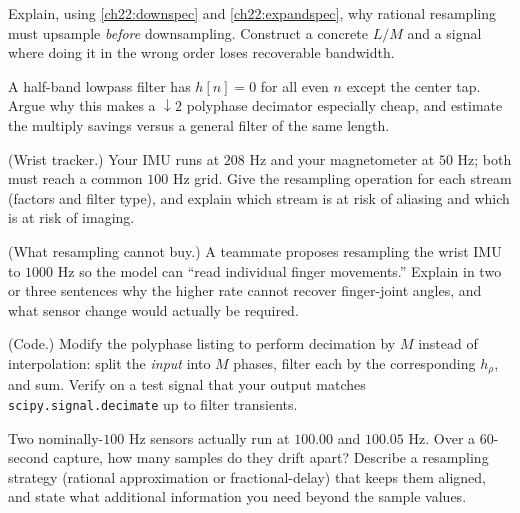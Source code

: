 \begin{exercise}
Explain, using \eqref{ch22:downspec} and \eqref{ch22:expandspec}, why rational
resampling must upsample \emph{before} downsampling. Construct a concrete $L/M$
and a signal where doing it in the wrong order loses recoverable bandwidth.
\end{exercise}

\begin{exercise}
A half-band lowpass filter has $h[n]=0$ for all even $n$ except the center tap.
Argue why this makes a $\downarrow 2$ polyphase decimator especially cheap, and
estimate the multiply savings versus a general filter of the same length.
\end{exercise}

\begin{exercise}
(Wrist tracker.) Your IMU runs at $208$ Hz and your magnetometer at $50$ Hz; both
must reach a common $100$ Hz grid. Give the resampling operation for each stream
(factors and filter type), and explain which stream is at risk of aliasing and
which is at risk of imaging.
\end{exercise}

\begin{exercise}
(What resampling cannot buy.) A teammate proposes resampling the wrist IMU to
$1000$ Hz so the model
can ``read individual finger movements.'' Explain in two or three sentences why
the higher rate cannot recover finger-joint angles, and what sensor change would
actually be required.
\end{exercise}

\begin{exercise}
(Code.) Modify the polyphase listing to perform decimation by $M$ instead of
interpolation: split the \emph{input} into $M$ phases, filter each by the
corresponding $h_\rho$, and sum. Verify on a test signal that your output matches
\texttt{scipy.signal.decimate} up to filter transients.
\end{exercise}

\begin{exercise}
Two nominally-$100$ Hz sensors actually run at $100.00$ and $100.05$ Hz. Over a
$60$-second capture, how many samples do they drift apart? Describe a resampling
strategy (rational approximation or fractional-delay) that keeps them aligned,
and state what additional information you need beyond the sample values.
\end{exercise}
